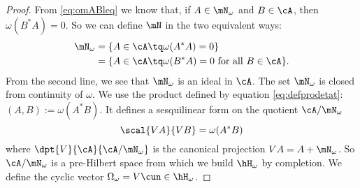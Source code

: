 \begin{proof}
From \eqref{eq:omABleq} we know that, if $A\in\mN_{\omega}$ and $B\in\cA$, then $\omega(B^*A)=0$. So we can define $\mN$ in the two equivalent ways:
\begin{equation}
    \begin{aligned}[]
        \mN_{\omega}&=\{ A\in\cA\tq \omega(A^*A)=0 \}\\
        &=\{ A\in\cA\tq \omega(B^*A)=0\textrm{ for all $B\in\cA$} \}.
    \end{aligned}
\end{equation}
From the second line, we see that $\mN_{\omega}$ is an ideal in $\cA$. The set $\mN_{\omega}$ is closed from continuity of $\omega$. We use the product defined by equation \eqref{eq:defprodetat}: $(A,B):=\omega(A^*B)$. It defines a sesquilinear form on the quotient $\cA/\mN_{\omega}$
\begin{equation}
\scal{ VA }{VB}=\omega(A^*B)
\end{equation}
where $\dpt{V}{\cA}{\cA/\mN_{\omega}}$ is the canonical projection $VA=A+\mN_{\omega}$. So $\cA/\mN_{\omega}$ is a pre-Hilbert space from which we build $\hH_{\omega}$ by completion. We define the cyclic vector $\Omega_{\omega}=V\cun\in\hH_{\omega}$.


\end{proof}
